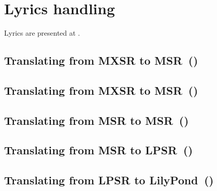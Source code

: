 



\chapter{Lyrics handling}\label{Lyrics handling}

Lyrics are presented at .


\section{Translating from MXSR to MSR\ (\mxsrToMsr{})}


\section{Translating from MXSR to MSR\ (\mxsrToMsr{})}


\section{Translating from MSR to MSR\ (\msrToMsr{})}


\section{Translating from MSR to LPSR\ (\msrToLpsr{})}


\section{Translating from LPSR to LilyPond\ (\lpsrToLilypond{})}


